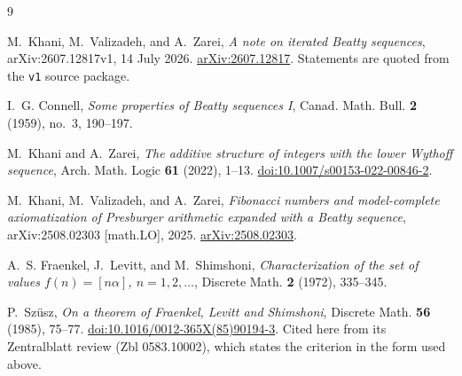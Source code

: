 \documentclass[11pt]{amsart}
\theoremstyle{remark}
\begin{document}
\begin{thebibliography}{9}

M.~Khani, M.~Valizadeh, and A.~Zarei,
\emph{A note on iterated Beatty sequences},
arXiv:2607.12817v1, 14 July 2026.
\href{https://arxiv.org/abs/2607.12817}{arXiv:2607.12817}.
Statements are quoted from the \texttt{v1} source package.

I.~G. Connell,
\emph{Some properties of Beatty sequences I},
Canad. Math. Bull. \textbf{2} (1959), no.~3, 190--197.

M.~Khani and A.~Zarei,
\emph{The additive structure of integers with the lower Wythoff sequence},
Arch. Math. Logic \textbf{61} (2022), 1--13.
\href{https://doi.org/10.1007/s00153-022-00846-2}{doi:10.1007/s00153-022-00846-2}.

M.~Khani, M.~Valizadeh, and A.~Zarei,
\emph{Fibonacci numbers and model-complete axiomatization of Presburger arithmetic
expanded with a Beatty sequence},
arXiv:2508.02303 [math.LO], 2025.
\href{https://arxiv.org/abs/2508.02303}{arXiv:2508.02303}.

A.~S. Fraenkel, J.~Levitt, and M.~Shimshoni,
\emph{Characterization of the set of values $f(n)=[n\alpha]$, $n=1,2,\ldots$},
Discrete Math. \textbf{2} (1972), 335--345.

P.~Sz\"usz,
\emph{On a theorem of Fraenkel, Levitt and Shimshoni},
Discrete Math. \textbf{56} (1985), 75--77.
\href{https://doi.org/10.1016/0012-365X(85)90194-3}{doi:10.1016/0012-365X(85)90194-3}.
Cited here from its Zentralblatt review (Zbl 0583.10002), which states the criterion in
the form used above.

\end{thebibliography}
\end{document}
